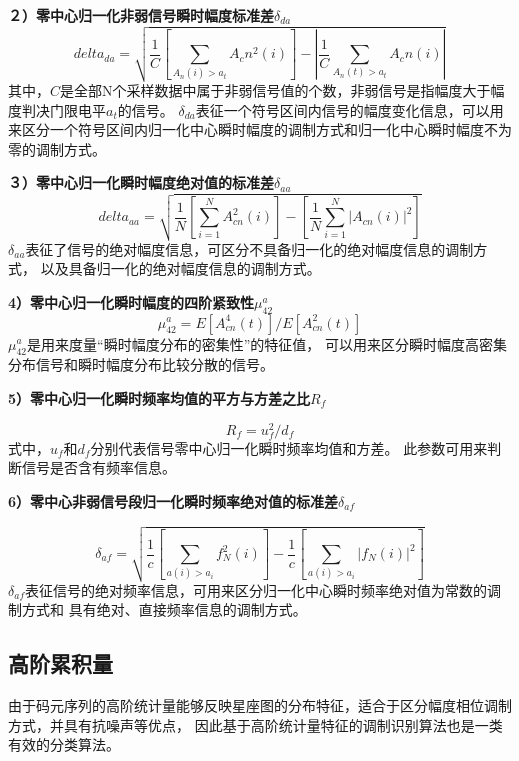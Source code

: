 \textbf{２）零中心归一化非弱信号瞬时幅度标准差$\delta_{da}$}
\begin{equation}
delta_{da}=\sqrt{\frac{1}{C}\left[\sum_{A_n(i)>a_t} A_cn^2(i)\right]
	- \left|\frac{1}{C} \sum_{A_n(t)>a_t} A_cn(i)\right|}
\end{equation}
其中，$C$是全部N个采样数据中属于非弱信号值的个数，非弱信号是指幅度大于幅度判决门限电平$a_t$的信号。
$\delta_{da}$表征一个符号区间内信号的幅度变化信息，可以用来区分一个符号区间内归一化中心瞬时幅度的调制方式和归一化中心瞬时幅度不为零的调制方式。


\textbf{３）零中心归一化瞬时幅度绝对值的标准差$\delta_{aa}$}
\begin{equation}
delta_{aa} = \sqrt{\frac{1}{N}\left[\sum_{i=1}^{N} A_{cn}^2(i)\right]
	- \left[\frac{1}{N} \sum_{i=1}^{N} \left|A_{cn}(i)\right|^2\right]}
\end{equation}
$\delta_{aa}$表征了信号的绝对幅度信息，可区分不具备归一化的绝对幅度信息的调制方式，
以及具备归一化的绝对幅度信息的调制方式。


\textbf{4）零中心归一化瞬时幅度的四阶紧致性$\mu_{42}^{a}$}
\begin{equation}
\mu_{42}^{a} = E\left[A_{cn}^{4} (t) \right] / E\left[A_{cn}^{2} (t) \right]
\end{equation}
$\mu_{42}^{a}$是用来度量“瞬时幅度分布的密集性”的特征值，
可以用来区分瞬时幅度高密集分布信号和瞬时幅度分布比较分散的信号。


\textbf{5）零中心归一化瞬时频率均值的平方与方差之比$R_f$}\par
\begin{equation}
R_f = u_f^2 / d_f
\end{equation}
式中，$u_f$和$d_f$分别代表信号零中心归一化瞬时频率均值和方差。
此参数可用来判断信号是否含有频率信息。


\textbf{6）零中心非弱信号段归一化瞬时频率绝对值的标准差$\delta_{af}$}

\begin{equation}
\delta_{af} = \sqrt{\frac{1}{c}\left[\sum_{a(i)>a_i} f_N^2(i)\right]
	- \frac{1}{c}\left[\sum_{a(i)>a_i} \left|f_N(i)\right|^2\right]}
\end{equation}
$\delta_{af}$表征信号的绝对频率信息，可用来区分归一化中心瞬时频率绝对值为常数的调制方式和
具有绝对、直接频率信息的调制方式。

\subsection{高阶累积量}

由于码元序列的高阶统计量能够反映星座图的分布特征，适合于区分幅度相位调制方式，并具有抗噪声等优点，
因此基于高阶统计量特征的调制识别算法也是一类有效的分类算法。\par

